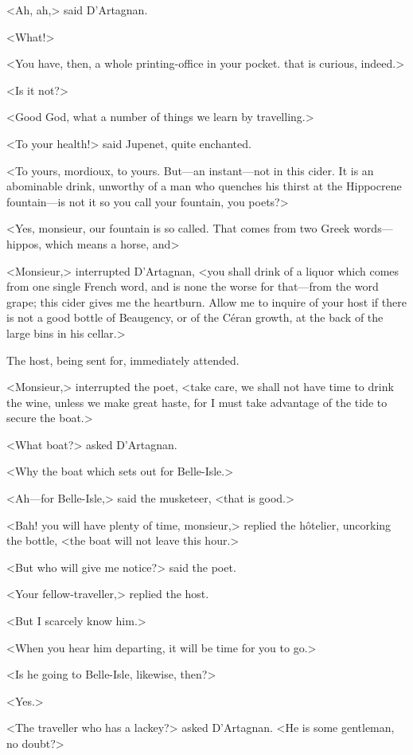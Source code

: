 <Ah, ah,> said D'Artagnan.

<What!>

<You have, then, a whole printing-office in your pocket.  that is curious, indeed.>

<Is it not?>

<Good God, what a number of things we learn by travelling.>

<To your health!> said Jupenet, quite enchanted.

<To yours, mordioux, to yours. But—an instant—not in this cider. It is an abominable drink, unworthy of a man who quenches his thirst at the Hippocrene fountain—is not it so you call your fountain, you poets?>

<Yes, monsieur, our fountain is so called. That comes from two Greek words—hippos, which means a horse, and\longdash>

<Monsieur,> interrupted D'Artagnan, <you shall drink of a liquor which comes from one single French word, and is none the worse for that—from the word grape; this cider gives me the heartburn. Allow me to inquire of your host if there is not a good bottle of Beaugency, or of the Céran growth, at the back of the large bins in his cellar.>

The host, being sent for, immediately attended.

<Monsieur,> interrupted the poet, <take care, we shall not have time to drink the wine, unless we make great haste, for I must take advantage of the tide to secure the boat.>

<What boat?> asked D'Artagnan.

<Why the boat which sets out for Belle-Isle.>

<Ah—for Belle-Isle,> said the musketeer, <that is good.>

<Bah! you will have plenty of time, monsieur,> replied the hôtelier, uncorking the bottle, <the boat will not leave this hour.>

<But who will give me notice?> said the poet.

<Your fellow-traveller,> replied the host.

<But I scarcely know him.>

<When you hear him departing, it will be time for you to go.>

<Is he going to Belle-Isle, likewise, then?>

<Yes.>

<The traveller who has a lackey?> asked D'Artagnan. <He is some gentleman, no doubt?>

